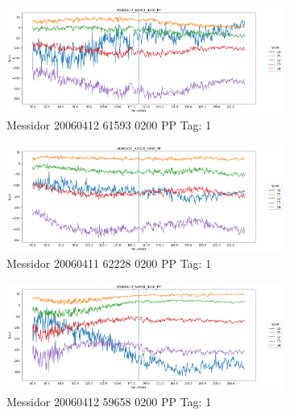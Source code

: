 \begin{figure}[ht!]
	\centering
	\begin{subfigure}[b]{ 0.85\textwidth}
		\centering
		\includegraphics[width=\textwidth]{Figures/chapter_stability/20060412_61593_0200_PP/s/scores.png}
		\caption{Messidor 20060412 61593 0200 PP Tag: 1}
	\end{subfigure}
	\begin{subfigure}[b]{ 0.85\textwidth}
		\centering
		\includegraphics[width=\textwidth]{Figures/chapter_stability/20060411_62228_0200_PP/s/scores.png}
		\caption{Messidor 20060411 62228 0200 PP Tag: 1}		
	\end{subfigure}	
	\begin{subfigure}[b]{ 0.85\textwidth}
		\centering
		\includegraphics[width=\textwidth]{Figures/chapter_stability/20060412_59658_0200_PP/s/scores.png}
		\caption{Messidor 20060412 59658 0200 PP Tag: 1}		
	\end{subfigure}
	\begin{subfigure}[b]{ 0.85\textwidth}

\end{subfigure}
\end{figure}
